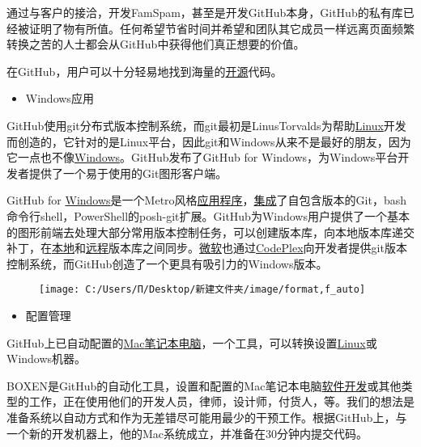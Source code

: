 \documentclass[
]{article}
\begin{document}
通过与客户的接洽，开发FamSpam，甚至是开发GitHub本身，GitHub的私有库已经被证明了物有所值。任何希望节省时间并希望和团队其它成员一样远离页面频繁转换之苦的人士都会从GitHub中获得他们真正想要的价值。

在GitHub，用户可以十分轻易地找到海量的\href{https://baike.baidu.com/item/开源/20720669}{开源}代码。

\begin{itemize}
\item
  Windows应用
\end{itemize}

GitHub使用git分布式版本控制系统，而git最初是LinusTorvalds为帮助\href{https://baike.baidu.com/item/Linux}{Linux}开发而创造的，它针对的是Linux平台，因此git和Windows从来不是最好的朋友，因为它一点也不像\href{https://baike.baidu.com/item/Windows}{Windows}。GitHub发布了GitHub
for Windows，为Windows平台开发者提供了一个易于使用的Git图形客户端。

GitHub for
\href{https://baike.baidu.com/item/Windows}{Windows}是一个Metro风格\href{https://baike.baidu.com/item/应用程序}{应用程序}，\href{https://baike.baidu.com/item/集成}{集成}了自包含版本的Git，bash命令行shell，PowerShell的posh-git扩展。GitHub为Windows用户提供了一个基本的图形前端去处理大部分常用版本控制任务，可以创建版本库，向本地版本库递交补丁，在\href{https://baike.baidu.com/item/本地}{本地}和\href{https://baike.baidu.com/item/远程}{远程}版本库之间同步。\href{https://baike.baidu.com/item/微软}{微软}也通过\href{https://baike.baidu.com/item/CodePlex}{CodePlex}向开发者提供git版本控制系统，而GitHub创造了一个更具有吸引力的Windows版本。

\begin{figure}
\centering
\texttt{[image: C:/Users/Π/Desktop/新建文件夹/image/format,f\_auto]}
\caption{}
\end{figure}

\begin{itemize}
\item
  配置管理
\end{itemize}

GitHub上已自动配置的\href{https://baike.baidu.com/item/Mac/173}{Mac}\href{https://baike.baidu.com/item/笔记本电脑}{笔记本电脑}，一个工具，可以转换设置\href{https://baike.baidu.com/item/Linux/27050}{Linux}或Windows机器。

BOXEN是GitHub的自动化工具，设置和配置的Mac笔记本电脑\href{https://baike.baidu.com/item/软件开发}{软件开发}或其他类型的工作，正在使用他们的开发人员，律师，设计师，付货人，等。我们的想法是准备系统以自动方式和作为无差错尽可能用最少的干预工作。根据GitHub上，与一个新的开发机器上，他的Mac系统成立，并准备在30分钟内提交代码。
\end{document}
